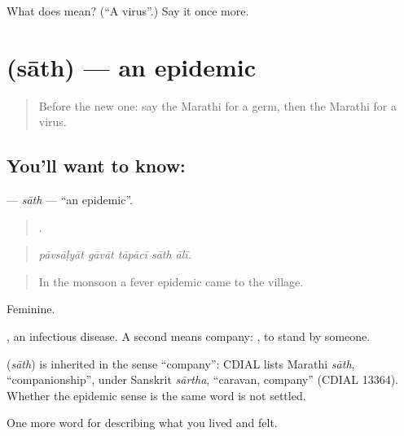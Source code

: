\begin{tcolorbox}[breakable,colback=teal!4,colframe=teal!35!black,title={Before you move on}]
What does  mean? (\textquotedblleft{}A virus\textquotedblright{}.) Say it once more.
\end{tcolorbox}
\section[\texorpdfstring{\mr{साथ} (sāth)}{साथ (sāth)}]{ (sāth) — an epidemic}

\label{lesson:MR-C484-sath}



\begin{quote}
Before the new one: say the Marathi for a germ, then the Marathi for a virus.
\end{quote}

\subsection*{You'll want to know: }
\textbf{} — \emph{sāth} — \textquotedblleft{}an epidemic\textquotedblright{}.

\begin{quote}
    .
\end{quote}

\begin{quote}
\emph{pāvsāḷyāt gāvāt tāpācī sāth ālī.}
\end{quote}

\begin{quote}
In the monsoon a fever epidemic came to the village.
\end{quote}

Feminine.

 , an infectious disease. A second  means company:  , to stand by someone.

\begin{cousinweb}
\textbf{} (\emph{sāth}) is inherited in the sense \textquotedblleft{}company\textquotedblright{}: CDIAL lists Marathi \emph{sāth}, \textquotedblleft{}companionship\textquotedblright{}, under Sanskrit \emph{sārtha}, \textquotedblleft{}caravan, company\textquotedblright{} (CDIAL 13364). Whether the epidemic sense is the same word is not settled.
\end{cousinweb}

\begin{grammarlens}[title={What you've built}]
One more word for describing what you lived and felt.
\end{grammarlens}

